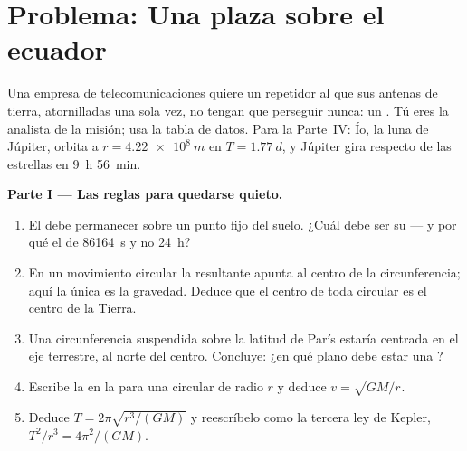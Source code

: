 \section{Problema: Una plaza sobre el ecuador}

\begin{problem}
\label{pb:g12:satellites-kepler:1}
Una empresa de telecomunicaciones quiere un repetidor al que sus antenas de tierra,
atornilladas una sola vez, no tengan que perseguir nunca: un  .
Tú eres la analista de la misión; usa la tabla de datos. Para la Parte~IV: Ío, la luna
de Júpiter, orbita a $r = \qty{4.22e8}{m}$ en $T = \qty{1.77}{d}$, y Júpiter gira
respecto de las estrellas en \qty{9}{h} \qty{56}{min}.

\medskip
\noindent\textbf{Parte I --- Las reglas para quedarse quieto.}
\begin{enumerate}
  \item El  debe permanecer sobre un punto fijo del suelo. ¿Cuál debe ser su
         --- y por qué el  de \qty{86164}{s} y no \qty{24}{h}?
  \item En un movimiento circular la  resultante apunta al centro de la
        circunferencia; aquí la única  es la gravedad. Deduce que el centro de
        toda  circular es el centro de la Tierra.
  \item Una circunferencia suspendida sobre la latitud de París estaría centrada en el
        eje terrestre, al norte del centro. Concluye: ¿en qué plano debe estar una
        ?
  \item Escribe la  en la  para una  circular
        de radio $r$ y deduce $v = \sqrt{GM/r}$.
  \item Deduce $T = 2\pi\sqrt{r^3/(GM)}$ y reescríbelo como la tercera ley de Kepler,
        $T^2/r^3 = 4\pi^2/(GM)$.
\end{enumerate}


\end{problem}
